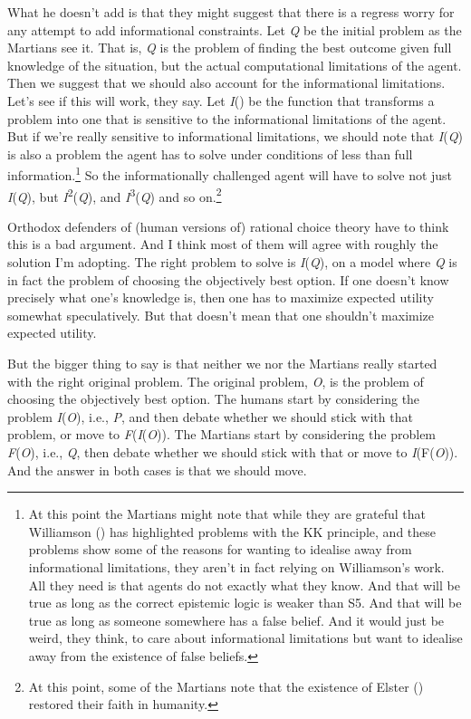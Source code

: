 \documentclass[
  10pt,
  letterpaper,
  DIV=11,
  numbers=noendperiod,
  twoside]{scrartcl}
\begin{document}
What he doesn't add is that they might suggest that there is a regress
worry for any attempt to add informational constraints. Let \emph{Q} be
the initial problem as the Martians see it. That is, \emph{Q} is the
problem of finding the best outcome given full knowledge of the
situation, but the actual computational limitations of the agent. Then
we suggest that we should also account for the informational
limitations. Let's see if this will work, they say. Let \emph{I}() be
the function that transforms a problem into one that is sensitive to the
informational limitations of the agent. But if we're really sensitive to
informational limitations, we should note that \emph{I}(\emph{Q}) is
also a problem the agent has to solve under conditions of less than full
information.\footnote{At this point the Martians might note that while
  they are grateful that Williamson
  () has highlighted problems with
  the KK principle, and these problems show some of the reasons for
  wanting to idealise away from informational limitations, they aren't
  in fact relying on Williamson's work. All they need is that agents do
  not exactly what they know. And that will be true as long as the
  correct epistemic logic is weaker than S5. And that will be true as
  long as someone somewhere has a false belief. And it would just be
  weird, they think, to care about informational limitations but want to
  idealise away from the existence of false beliefs.} So the
informationally challenged agent will have to solve not just
\emph{I}(\emph{Q}), but \emph{I}\textsuperscript{2}(\emph{Q}), and
\emph{I}\textsuperscript{3}(\emph{Q}) and so on.\footnote{At this point,
  some of the Martians note that the existence of Elster
  () restored their faith in humanity.}

Orthodox defenders of (human versions of) rational choice theory have to
think this is a bad argument. And I think most of them will agree with
roughly the solution I'm adopting. The right problem to solve is
\emph{I}(\emph{Q}), on a model where \emph{Q} is in fact the problem of
choosing the objectively best option. If one doesn't know precisely what
one's knowledge is, then one has to maximize expected utility somewhat
speculatively. But that doesn't mean that one shouldn't maximize
expected utility.

But the bigger thing to say is that neither we nor the Martians really
started with the right original problem. The original problem, \emph{O},
is the problem of choosing the objectively best option. The humans start
by considering the problem \emph{I}(\emph{O}), i.e., \emph{P}, and then
debate whether we should stick with that problem, or move to
\emph{F}(\emph{I}(\emph{O})). The Martians start by considering the
problem \emph{F}(\emph{O}), i.e., \emph{Q}, then debate whether we
should stick with that or move to \emph{I}(F(\emph{O})). And the answer
in both cases is that we should move.
\end{document}
